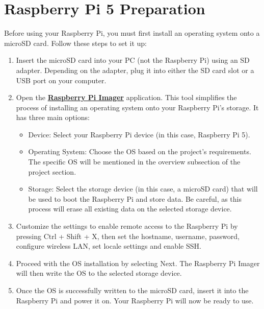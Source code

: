 \section*{Raspberry Pi 5 Preparation}

Before using your Raspberry Pi, you must first install an operating system onto a microSD card. Follow these steps to set it up:
\begin{enumerate}
    \item Insert the microSD card into your PC (not the Raspberry Pi) using an SD adapter. Depending on the adapter, plug it into either the SD card slot or a USB port on your computer.
    \item Open the \href{https://www.raspberrypi.com/software}{\textbf{\color{blue}Raspberry Pi Imager}} application. This tool simplifies the process of installing an operating system onto your Raspberry Pi’s storage. It has three main options:
    \begin{itemize}
        \item Device: Select your Raspberry Pi device (in this case, Raspberry Pi 5).
        \item Operating System: Choose the OS based on the project’s requirements. The specific OS will be mentioned in the overview subsection of the project section.
        \item Storage: Select the storage device (in this case, a microSD card) that will be used to boot the Raspberry Pi and store data. Be careful, as this process will erase all existing data on the selected storage device.
    \end{itemize}
    \item Customize the settings to enable remote access to the Raspberry Pi by pressing Ctrl + Shift + X, then set the hostname, username, password, configure wireless LAN, set locale settings and enable SSH.
    \item Proceed with the OS installation by selecting Next. The Raspberry Pi Imager will then write the OS to the selected storage device.
    \item Once the OS is successfully written to the microSD card, insert it into the Raspberry Pi and power it on. Your Raspberry Pi will now be ready to use.
\end{enumerate}

